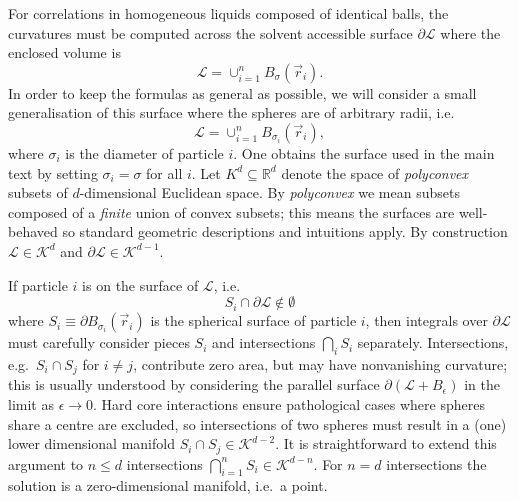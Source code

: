 For correlations in homogeneous liquids composed of identical balls, the curvatures must be computed across the solvent accessible surface $\partial\mathcal{L}$ where the enclosed volume is
\begin{equation*}
  \mathcal{L} = \cup_{i=1}^n B_\sigma(\vec{r}_i).
\end{equation*}
In order to keep the formulas as general as possible, we will consider a small generalisation of this surface where the spheres are of arbitrary radii, i.e.\
\begin{equation}\label{eq:generalised-volume}
  \mathcal{L} = \cup_{i=1}^n B_{\sigma_i}(\vec{r}_i),
\end{equation}
where $\sigma_i$ is the diameter of particle $i$.
One obtains the surface used in the main text by setting $\sigma_i = \sigma$ for all $i$.
Let $K^d \subseteq \mathbb{R}^d$ denote the space of \emph{polyconvex} subsets of $d$-dimensional Euclidean space.
By \emph{polyconvex} we mean subsets composed of a \emph{finite} union of convex subsets; this means the surfaces are well-behaved so standard geometric descriptions and intuitions apply.
By construction $\mathcal{L} \in \mathcal{K}^d$ and $\partial\mathcal{L} \in \mathcal{K}^{d-1}$.

If particle $i$ is on the surface of $\mathcal{L}$, i.e.
\begin{equation*}
  S_i %
  \cap \partial\mathcal{L} \notin \emptyset %
\end{equation*}
where $S_i \equiv \partial B_{\sigma_i}(\vec{r}_i)$ is the spherical surface of particle $i$, then integrals over $\partial\mathcal{L}$ must carefully consider pieces $S_i$ and intersections $\bigcap_i S_i$ separately.
Intersections, e.g.\ $S_i \cap S_j$ for $i \ne j$, contribute zero area, but may have nonvanishing curvature; this is usually understood by considering the parallel surface $\partial(\mathcal{L}+B_\epsilon)$ in the limit as $\epsilon \to 0$.
Hard core interactions ensure pathological cases where spheres share a centre are excluded, so intersections of two spheres must result in a (one) lower dimensional manifold $S_i \cap S_j \in \mathcal{K}^{d-2}$.
It is straightforward to extend this argument to $n \le d$ intersections $\bigcap_{i=1}^{n} S_i \in \mathcal{K}^{d-n}$.
For $n = d$ intersections the solution is a zero-dimensional manifold, i.e.\ a point.

